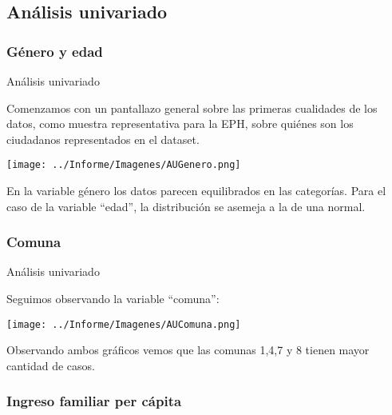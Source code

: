 \documentclass[pdf]{beamer}
\begin{document}

\subsection{Análisis univariado}

    \subsubsection{Género y edad}

\begin{frame}{Análisis univariado}

    Comenzamos con un pantallazo general sobre las primeras cualidades de los datos, como muestra representativa para la EPH, sobre quiénes son los ciudadanos representados en el dataset.

    \begin{center}
        \texttt{[image: ../Informe/Imagenes/AUGenero.png]}
    \end{center}

    En la variable género los datos parecen equilibrados en las categorías. Para el caso de la variable ``edad'', la distribución se asemeja a la de una normal.

\end{frame}
              
    \subsubsection{Comuna}

\begin{frame}{Análisis univariado}

    Seguimos observando la variable ``comuna'':
    \begin{center}
        \texttt{[image: ../Informe/Imagenes/AUComuna.png]}    
    \end{center}
    Observando ambos gráficos vemos que las comunas 1,4,7 y 8 tienen mayor cantidad de casos.
    
\end{frame}
           
    \subsubsection{Ingreso familiar per cápita}
\end{document}
